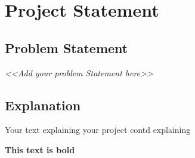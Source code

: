 \chapter{Project Statement}

\section{Problem Statement}
\emph{<<Add your problem Statement here>>}

\section{Explanation}


Your text explaining your project \cite{short_paper_name} contd explaining


\textbf{This text is bold}


